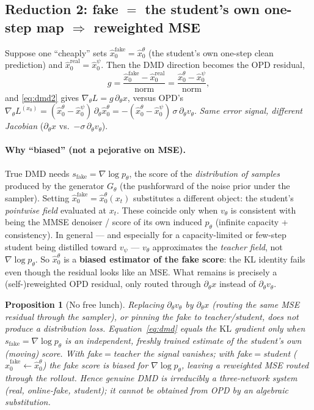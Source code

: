 \documentclass[11pt,a4paper]{article}
\newcommand{\KL}{\mathrm{KL}}
\newcommand{\xh}{\hat{x}_0}
\newcommand{\real}{\mathrm{real}}
\newcommand{\fake}{\mathrm{fake}}
\newtheorem*{prop*}{Proposition}
\begin{document}
\subsection[Reduction 2: fake equals the student map]
{Reduction 2: fake $=$ the student's own one-step map $\Rightarrow$ reweighted MSE}
Suppose one ``cheaply'' sets $\xh^{\fake}=\xh^\theta$ (the student's own one-step clean prediction)
and $\xh^{\real}=\xh^\psi$. Then the DMD direction becomes the OPD residual,
\begin{equation}
g=\frac{\xh^{\fake}-\xh^{\real}}{\mathrm{norm}}=\frac{\xh^\theta-\xh^\psi}{\mathrm{norm}},
\end{equation}
and \eqref{eq:dmd2} gives $\nabla_\theta L=g\,\partial_\theta x$, versus OPD's
$\nabla_\theta L^{(x_0)}=(\xh^\theta-\xh^\psi)\,\partial_\theta\xh^\theta
=-(\xh^\theta-\xh^\psi)\,\sigma\,\partial_\theta v_\theta$. \emph{Same error signal, different
Jacobian} ($\partial_\theta x$ vs.\ $-\sigma\,\partial_\theta v_\theta$).

\paragraph{Why ``biased'' (not a pejorative on MSE).}
True DMD needs $s_{\fake}=\nabla\log p_\theta$, the score of the \emph{distribution of samples}
produced by the generator $G_\theta$ (the pushforward of the noise prior under the sampler).
Setting $\xh^{\fake}=\xh^\theta(x_t)$ substitutes a different object: the student's
\emph{pointwise field} evaluated at $x_t$. These coincide only when $v_\theta$ is consistent
with being the MMSE denoiser / score of its own induced $p_\theta$ (infinite capacity +
consistency). In general --- and especially for a capacity-limited or few-step student being
distilled toward $v_\psi$ --- $v_\theta$ approximates the \emph{teacher field}, not
$\nabla\log p_\theta$. So $\xh^\theta$ is a \textbf{biased estimator of the fake score}:
the KL identity fails even though the residual looks like an MSE. What remains is precisely
a (self-)reweighted OPD residual, only routed through $\partial_\theta x$ instead of
$\partial_\theta v_\theta$.

\begin{prop*}[No free lunch]
Replacing $\partial_\theta v_\theta$ by $\partial_\theta x$ (routing the same MSE residual through
the sampler), or pinning the fake to teacher/student, does \emph{not} produce a distribution loss.
Equation~\eqref{eq:dmd} equals the $\KL$ gradient only when $s_{\fake}=\nabla\log p_\theta$ is an
\emph{independent, freshly trained} estimate of the student's own (moving) score. With
fake$=$teacher the signal vanishes; with fake$=$student ($\xh^{\fake}\leftarrow\xh^\theta$) the
fake score is biased for $\nabla\log p_\theta$, leaving a reweighted MSE routed through the
rollout. Hence genuine DMD is irreducibly a \emph{three-network} system
(real, online-fake, student); it cannot be obtained from OPD by an algebraic substitution.
\end{prop*}
\end{document}
